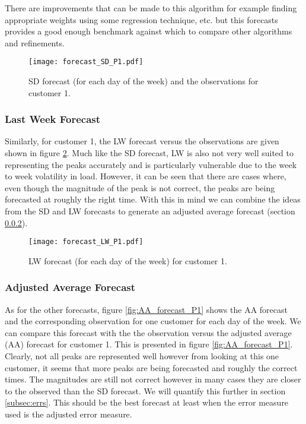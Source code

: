 \documentclass[a4paper]{article}
\begin{document}
There are improvements that can be made to this algorithm for example finding appropriate weights using some regression technique, etc. but this forecasts provides a good enough benchmark against which to compare other algorithms and refinements.


\begin{figure}
\centering
\texttt{[image: forecast\_SD\_P1.pdf]}
\caption{SD forecast (for each day of the week) and the observations for customer 1.}
\label{fig:SDforecast} 
\end{figure}

\subsubsection{Last Week Forecast} \label{subsubsec:LW_res}
Similarly, for customer 1, the LW forecast versus the observations are given shown in figure \ref{fig:LW_forecast_P1}. Much like the SD forecast, LW is also not very well suited to representing the peaks accurately and is particularly vulnerable due to the week to week volatility in load. However, it can be seen that there are cases where, even though the magnitude of the peak is not correct, the peaks are being forecasted at roughly the right time. With this in mind we can combine the ideas from the SD and LW forecasts to generate an adjusted average forecast (section \ref{subsubsec:AA_res}).

\begin{figure}
\texttt{[image: forecast\_LW\_P1.pdf]}
\caption{LW forecast (for each day of the week) for customer 1.}
\label{fig:LW_forecast_P1} 
\end{figure}

\subsubsection{Adjusted Average Forecast} \label{subsubsec:AA_res}
As for the other forecasts, figure \ref{fig:AA_forecast_P1} shows the AA forecast and the corresponding observation for one customer for each day of the week. We can compare this forecast with the the observation versus the adjusted average (AA) forecast for customer 1. This is presented in figure \ref{fig:AA_forecast_P1}. Clearly, not all peaks are represented well however from looking at this one customer, it seems that more peaks are being forecasted and roughly the correct times. The magnitudes are still not correct however in many cases they are closer to the observed than the SD forecast. We will quantify this further in section \ref{subsec:errs}. This should be the best forecast at least when the error measure used is the adjusted error measure.
\end{document}
